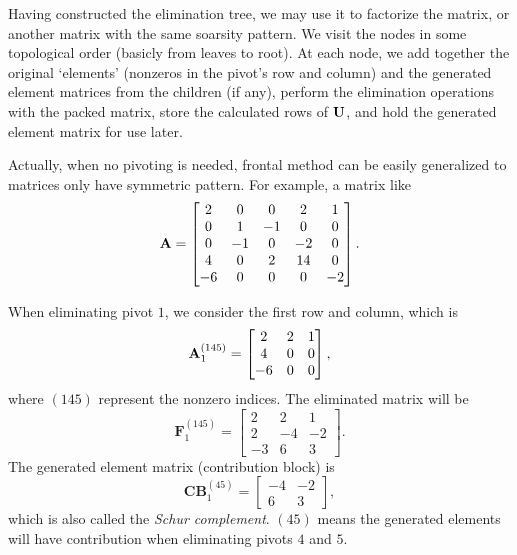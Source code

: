 \begin{lem}
    Having constructed the elimination tree, we may use it to 
    factorize the matrix, or another matrix with the same 
    soarsity pattern. We visit the nodes in some topological 
    order (basicly from leaves to root). At each node, we add 
    together the original `elements' (nonzeros in the pivot's 
    row and column) and the generated element matrices from the
    children (if any), perform the elimination operations with 
    the packed matrix, store the calculated rows of ${\mathbf{U}}$, and 
    hold the generated element matrix for use later.
\end{lem}

\begin{exm}
    Actually, when no pivoting is needed, frontal method can 
    be easily generalized to matrices only have symmetric 
    pattern. For example, a matrix like
    $$
    {\mathbf{A}}=
    \begin{bmatrix}
        2&0&0&2&1\\
        0&1&-1&0&0\\
        0&-1&0&-2&0\\
        4&0&2&14&0\\
        -6&0&0&0&-2
    \end{bmatrix}.
    $$ 

    When eliminating pivot $1$, we consider the first row and 
    column, which is
    $$
    {\mathbf{A}}_1^{(145)}=
    \begin{bmatrix}
        2&2&1\\
        4&0&0\\
        -6&0&0
    \end{bmatrix},
    $$ 
    where $(145)$ represent the nonzero indices. The eliminated matrix 
    will be
    $$
    \mathbf{F}_1^{(145)}=
    \begin{bmatrix}
        2&2&1\\
        2&-4&-2\\
        -3&6&3
    \end{bmatrix}.
    $$ 
    The generated element matrix (contribution block) is
    $$
    \mathbf{CB}_1^{(45)}=
    \begin{bmatrix}
        -4&-2\\
        6&3
    \end{bmatrix},
    $$ 
    which is also called the \textit{Schur complement}. $(45)$ 
    means the generated elements will have contribution when 
    eliminating pivots $4$ and $5$.


\end{exm}
